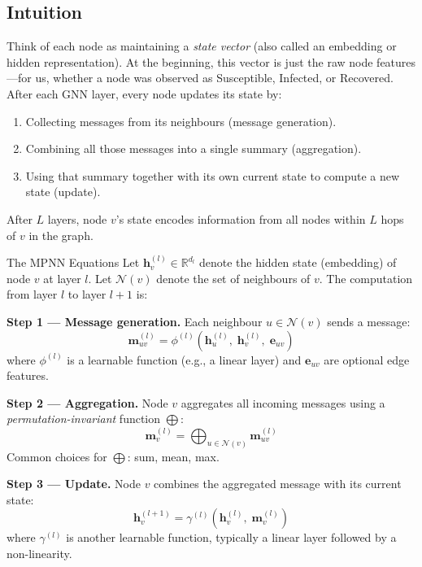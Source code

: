 \subsection{Intuition}

Think of each node as maintaining a \emph{state vector} (also called an embedding or hidden representation). At the beginning, this vector is just the raw node features---for us, whether a node was observed as Susceptible, Infected, or Recovered. After each GNN layer, every node updates its state by:
\begin{enumerate}[noitemsep]
    \item Collecting messages from its neighbours (message generation).
    \item Combining all those messages into a single summary (aggregation).
    \item Using that summary together with its own current state to compute a new state (update).
\end{enumerate}
After $L$ layers, node $v$'s state encodes information from all nodes within $L$ hops of $v$ in the graph.

\begin{mathbox}{The MPNN Equations}
Let $\mathbf{h}_v^{(l)} \in \mathbb{R}^{d_l}$ denote the hidden state (embedding) of node $v$ at layer $l$. Let $\mathcal{N}(v)$ denote the set of neighbours of $v$. The computation from layer $l$ to layer $l+1$ is:

\textbf{Step 1 --- Message generation.} Each neighbour $u \in \mathcal{N}(v)$ sends a message:
\begin{equation}
    \mathbf{m}_{uv}^{(l)} = \phi^{(l)}\!\left(\mathbf{h}_u^{(l)},\; \mathbf{h}_v^{(l)},\; \mathbf{e}_{uv}\right)
    \label{eq:mpnn_message}
\end{equation}
where $\phi^{(l)}$ is a learnable function (e.g., a linear layer) and $\mathbf{e}_{uv}$ are optional edge features.

\textbf{Step 2 --- Aggregation.} Node $v$ aggregates all incoming messages using a \emph{permutation-invariant} function $\bigoplus$:
\begin{equation}
    \mathbf{m}_v^{(l)} = \bigoplus_{u \in \mathcal{N}(v)} \mathbf{m}_{uv}^{(l)}
    \label{eq:mpnn_agg}
\end{equation}
Common choices for $\bigoplus$: sum, mean, max.

\textbf{Step 3 --- Update.} Node $v$ combines the aggregated message with its current state:
\begin{equation}
    \mathbf{h}_v^{(l+1)} = \gamma^{(l)}\!\left(\mathbf{h}_v^{(l)},\; \mathbf{m}_v^{(l)}\right)
    \label{eq:mpnn_update}
\end{equation}
where $\gamma^{(l)}$ is another learnable function, typically a linear layer followed by a non-linearity.
\end{mathbox}

